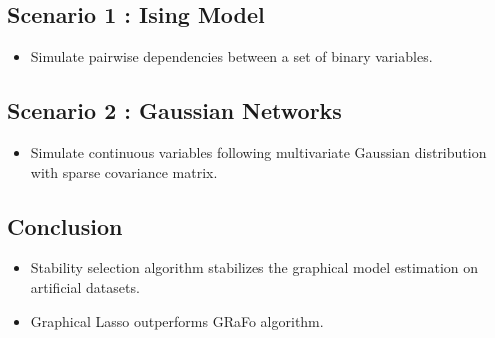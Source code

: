\documentclass[landscape,a0paper,fontscale=0.285]{postertemplate} %
\newcommand{\compresslist}{ %
\setlength{\itemsep}{1pt}
\setlength{\parskip}{0pt}
\setlength{\parsep}{0pt}
}
\begin{document}
\begin{poster}
{\begin{multicols}{2}
\begin{center}
\subsection*{Scenario 1 : Ising Model}
\end{center}

\begin{itemize}\compresslist
\item Simulate pairwise dependencies between a set of binary variables.
\end{itemize}

\begin{center}
\end{center}



\begin{center}
\subsection*{Scenario 2 : Gaussian Networks}
\end{center}


\begin{itemize}\compresslist
\item Simulate continuous variables following multivariate Gaussian distribution with sparse covariance matrix.
\end{itemize}

\begin{center}
\end{center}

\end{multicols}

\vspace{-1 cm}
\begin{center}
\subsection*{Conclusion}
\end{center}

\begin{itemize}\compresslist
\item Stability selection algorithm stabilizes the graphical model estimation on artificial datasets.
\item Graphical Lasso outperforms GRaFo algorithm.
\end{itemize}
}


\end{poster}
\end{document}
